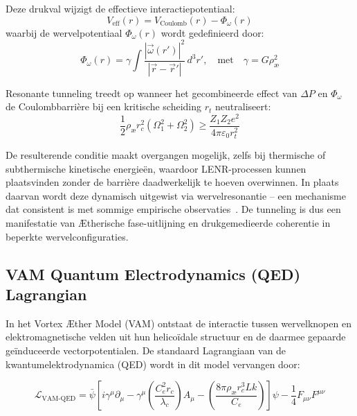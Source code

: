 Deze drukval wijzigt de effectieve interactiepotentiaal:
\begin{equation}
    V_\text{eff}(r) = V_\text{Coulomb}(r) - \Phi_\omega(r)
\end{equation}
waarbij de wervelpotentiaal \( \Phi_\omega(r) \) wordt gedefinieerd door:
\begin{equation}
    \Phi_\omega(r) = \gamma \int \frac{|\vec{\omega}(r')|^2}{|\vec{r} - \vec{r}'|} \, d^3r',
    \quad \text{met} \quad
    \gamma = G \rho_\text{\ae}^2
\end{equation}

Resonante tunneling treedt op wanneer het gecombineerde effect van \( \Delta P \) en \( \Phi_\omega \) de Coulombbarrière bij een kritische scheiding \( r_t \) neutraliseert:
\begin{equation}
    \frac{1}{2} \rho_\text{\ae} r_c^2 (\Omega_1^2 + \Omega_2^2) \geq \frac{Z_1 Z_2 e^2}{4\pi \varepsilon_0 r_t^2}
\end{equation}

De resulterende conditie maakt overgangen mogelijk, zelfs bij thermische of subthermische kinetische energieën, waardoor LENR-processen kunnen plaatsvinden zonder de barrière daadwerkelijk te hoeven overwinnen. In plaats daarvan wordt deze dynamisch uitgewist via wervelresonantie – een mechanisme dat consistent is met sommige empirische observaties~\cite{Storms2021}. De tunneling is dus een manifestatie van Ætherische fase-uitlijning en drukgemedieerde coherentie in beperkte wervelconfiguraties.



\subsection*{VAM Quantum Electrodynamics (QED) Lagrangian}

In het Vortex Æther Model (VAM) ontstaat de interactie tussen wervelknopen en elektromagnetische velden uit hun helicoïdale structuur en de daarmee gepaarde geïnduceerde vectorpotentialen. De standaard Lagrangiaan van de kwantumelektrodynamica (QED) wordt in dit model vervangen door:

\begin{equation}
    \mathcal{L}_\text{VAM-QED} =
    \bar{\psi} \left[ i \gamma^\mu \partial_\mu
                   - \gamma^\mu \left( \frac{C_e^2 r_c}{\lambda_c} \right) A_\mu
                   - \left( \frac{8\pi \rho_\text{\ae} r_c^3 Lk}{C_e} \right) \right] \psi
    - \frac{1}{4} F_{\mu\nu} F^{\mu\nu}
\end{equation}


